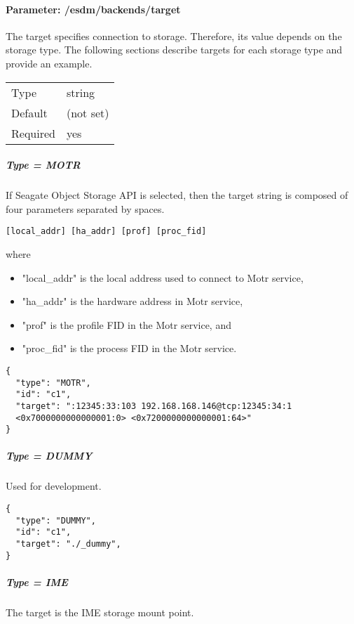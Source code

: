 \paragraph{Parameter: /esdm/backends/target}
The target specifies connection to storage.
Therefore, its value depends on the storage type.
The following sections describe targets for each storage type and provide an example.

\begin{preserve}
  \noindent
  \begin{tabular}{ll}
    Type     & string    \\ 
    Default  & (not set) \\ 
    Required & yes       \\ 
  \end{tabular}
\end{preserve}
\subparagraph{Type = MOTR}
If Seagate Object Storage API is selected, then the target string is composed of four parameters separated by spaces.

\begin{lstlisting} 
[local_addr] [ha_addr] [prof] [proc_fid]
\end{lstlisting}

where
\begin{itemize}
  \item "local\_addr" is the local address used to connect to Motr service, 
  \item "ha\_addr" is the hardware address in Motr service, 
  \item "prof" is the profile FID in the Motr service, and
  \item "proc\_fid" is the process FID in the Motr service.
\end{itemize}

\begin{lstlisting}
{
  "type": "MOTR",
  "id": "c1",
  "target": ":12345:33:103 192.168.168.146@tcp:12345:34:1 
  <0x7000000000000001:0> <0x7200000000000001:64>"
}
\end{lstlisting}
\FloatBarrier
\vspace{\gapsize}


\subparagraph{Type = DUMMY}
Used for development.

\begin{lstlisting}
{
  "type": "DUMMY",
  "id": "c1",
  "target": "./_dummy",
}
\end{lstlisting}
\FloatBarrier
\vspace{\gapsize}

\subparagraph{Type = IME}
The target is the IME storage mount point.

